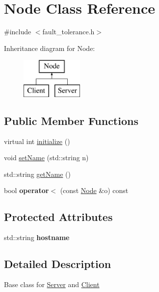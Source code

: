 \hypertarget{classNode}{\section{Node Class Reference}
\label{classNode}
}


{\ttfamily \#include $<$fault\-\_\-tolerance.\-h$>$}

Inheritance diagram for Node\-:\begin{figure}[H]
\begin{center}
\leavevmode
\includegraphics[height=2.000000cm]{classNode}
\end{center}
\end{figure}
\subsection*{Public Member Functions}
\begin{DoxyCompactItemize}
\item 
virtual int \hyperlink{classNode_acfbc12d3b7d414fb12811041b04a1809}{initialize} ()
\item 
void \hyperlink{classNode_af79916b6bb2580b7cf9397bdeb172988}{set\-Name} (std\-::string n)
\item 
std\-::string \hyperlink{classNode_a3e5ac6b5881a3a9d82f3112953c1e546}{get\-Name} ()
\item 
\hypertarget{classNode_a821b0d4eb044c0ee3a61a3a1faadbe9f}{bool {\bfseries operator$<$} (const \hyperlink{classNode}{Node} \&o) const }\label{classNode_a821b0d4eb044c0ee3a61a3a1faadbe9f}

\end{DoxyCompactItemize}
\subsection*{Protected Attributes}
\begin{DoxyCompactItemize}
\item 
\hypertarget{classNode_a9f5a57e15567a0b92cb8d25bcec7bd24}{std\-::string {\bfseries hostname}}\label{classNode_a9f5a57e15567a0b92cb8d25bcec7bd24}

\end{DoxyCompactItemize}


\subsection{Detailed Description}
Base class for \hyperlink{classServer}{Server} and \hyperlink{classClient}{Client} 

